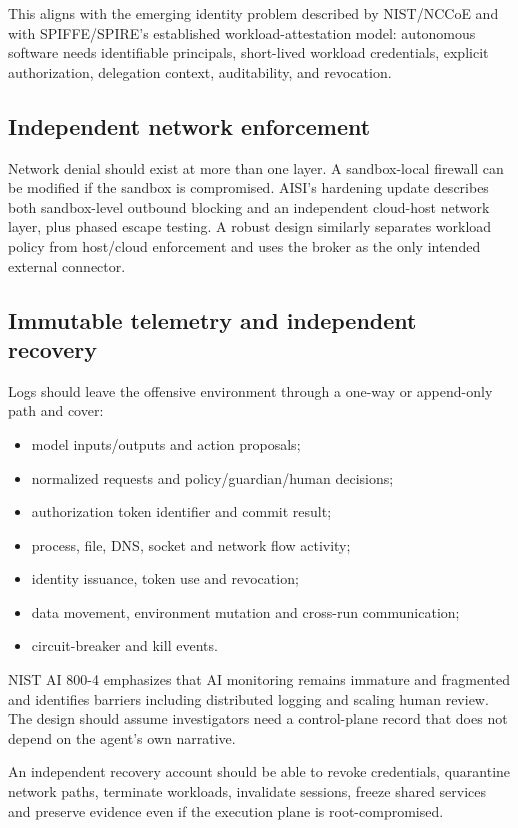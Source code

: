 \documentclass[11pt,letterpaper]{article}
\begin{document}
This aligns with the emerging identity problem described by NIST/NCCoE and with SPIFFE/SPIRE's established workload-attestation model: autonomous software needs identifiable principals, short-lived workload credentials, explicit authorization, delegation context, auditability, and revocation.\cite{nist8005,nccoe-identity,spiffe-spire}

\subsection{Independent network enforcement}
Network denial should exist at more than one layer. A sandbox-local firewall can be modified if the sandbox is compromised. AISI's hardening update describes both sandbox-level outbound blocking and an independent cloud-host network layer, plus phased escape testing.\cite{aisi-hardening} A robust design similarly separates workload policy from host/cloud enforcement and uses the broker as the only intended external connector.

\subsection{Immutable telemetry and independent recovery}
Logs should leave the offensive environment through a one-way or append-only path and cover:
\begin{itemize}
  \item model inputs/outputs and action proposals;
  \item normalized requests and policy/guardian/human decisions;
  \item authorization token identifier and commit result;
  \item process, file, DNS, socket and network flow activity;
  \item identity issuance, token use and revocation;
  \item data movement, environment mutation and cross-run communication;
  \item circuit-breaker and kill events.
\end{itemize}

NIST AI 800-4 emphasizes that AI monitoring remains immature and fragmented and identifies barriers including distributed logging and scaling human review.\cite{nist8004} The design should assume investigators need a control-plane record that does not depend on the agent's own narrative.

An independent recovery account should be able to revoke credentials, quarantine network paths, terminate workloads, invalidate sessions, freeze shared services and preserve evidence even if the execution plane is root-compromised.
\end{document}
